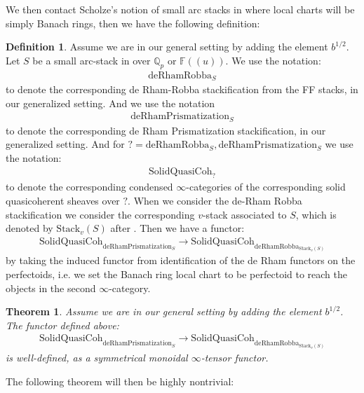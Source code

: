 \documentclass[12pt]{article}
\newtheorem{theorem}{Theorem}
\theoremstyle{definition}
\newtheorem{definition}{Definition}
\begin{document}
\noindent We then contact Scholze's notion of small arc stacks in \cite{1S5} \cite{1S6} where local charts will be simply Banach rings, then we have the following definition:

\begin{definition}
Assume we are in our general setting by adding the element $b^{1/2}$. Let $S$ be a small arc-stack in \cite{1S5} over $\mathbb{Q}_p$ or $\mathbb{F}((u))$. We use the notation:
\begin{align}
\mathrm{deRhamRobba}_S
\end{align}
to denote the corresponding de Rham-Robba stackification from the FF stacks, in our generalized setting. And we use the notation
\begin{align}
\mathrm{deRhamPrismatization}_S
\end{align}
to denote the corresponding de Rham Prismatization stackification, in our generalized setting. And for $?= \mathrm{deRhamRobba}_S, \mathrm{deRhamPrismatization}_S$ we use the notation:
\begin{align}
\mathrm{SolidQuasiCoh}_?
\end{align}
to denote the corresponding condensed $\infty$-categories of the corresponding solid quasicoherent sheaves over $?$. When we consider the de-Rham Robba stackification we consider the corresponding $v$-stack associated to $S$, which is denoted by $\mathrm{Stack}_v(S)$ after \cite{1S5}. Then we have a functor:
\begin{align}
\mathrm{SolidQuasiCoh}_{\mathrm{deRhamPrismatization}_S}\rightarrow \mathrm{SolidQuasiCoh}_{\mathrm{deRhamRobba}_{\mathrm{Stack}_v(S)}}
\end{align}
by taking the induced functor from identification of the de Rham functors on the perfectoids, i.e. we set the Banach ring local chart to be perfectoid to reach the objects in the second $\infty$-category. 
\end{definition}


\begin{theorem}
Assume we are in our general setting by adding the element $b^{1/2}$. The functor defined above:
\begin{align}
\mathrm{SolidQuasiCoh}_{\mathrm{deRhamPrismatization}_S}\longrightarrow \mathrm{SolidQuasiCoh}_{\mathrm{deRhamRobba}_{\mathrm{Stack}_v(S)}}
\end{align}
is well-defined, as a symmetrical monoidal $\infty$-tensor functor.
\end{theorem}

The following theorem will then be highly nontrivial:
\end{document}
